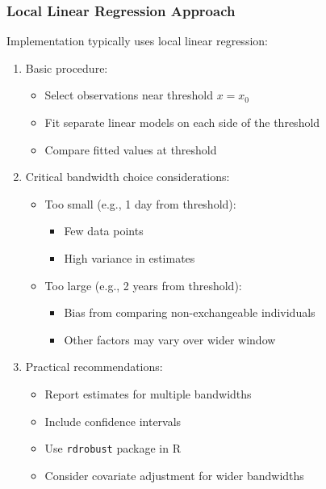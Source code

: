 \subsubsection{Local Linear Regression Approach}

Implementation typically uses local linear regression:

\begin{enumerate}
    \item Basic procedure:
    \begin{itemize}
        \item Select observations near threshold $x=x_0$
        \item Fit separate linear models on each side of the threshold
        \item Compare fitted values at threshold
    \end{itemize}

    \item Critical bandwidth choice considerations:
    \begin{itemize}
        \item Too small (e.g., 1 day from threshold):
        \begin{itemize}
            \item Few data points
            \item High variance in estimates
        \end{itemize}
        \item Too large (e.g., 2 years from threshold):
        \begin{itemize}
            \item Bias from comparing non-exchangeable individuals
            \item Other factors may vary over wider window
        \end{itemize}
    \end{itemize}

    \item Practical recommendations:
    \begin{itemize}
        \item Report estimates for multiple bandwidths
        \item Include confidence intervals
        \item Use \texttt{rdrobust} package in R
        \item Consider covariate adjustment for wider bandwidths
    \end{itemize}
\end{enumerate}

